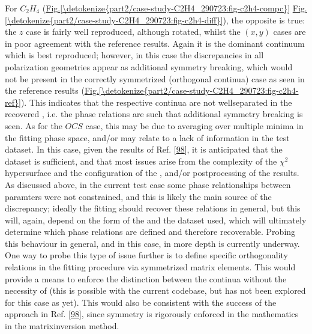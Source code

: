 \documentclass[letterpaper,table,10pt,english]{jupyterBook}
\begin{document}
\sphinxAtStartPar
For \(C_2H_4\) (\hyperref[\detokenize{part2/case-study-C2H4_290723:fig-c2h4-compc}]{Fig.\@ \ref{\detokenize{part2/case-study-C2H4_290723:fig-c2h4-compc}}} \sphinxhyphen{} \hyperref[\detokenize{part2/case-study-C2H4_290723:fig-c2h4-diff}]{Fig.\@ \ref{\detokenize{part2/case-study-C2H4_290723:fig-c2h4-diff}}}), the opposite is true: the \(z\) case is fairly well reproduced, although rotated, whilst the \((x,y)\) cases are in poor agreement with the reference results. Again it is the dominant continuum which is best reproduced; however, in this case the discrepancies in all polarization geometries appear as additional symmetry breaking, which would not be present in the correctly symmetrized (orthogonal continua) case \sphinxhyphen{} as seen in the reference results (\hyperref[\detokenize{part2/case-study-C2H4_290723:fig-c2h4-ref}]{Fig.\@ \ref{\detokenize{part2/case-study-C2H4_290723:fig-c2h4-ref}}}). This indicates that the respective continua are not well\sphinxhyphen{}separated in the recovered {\hyperref[\detokenize{backmatter/glossary:term-radial-matrix-elements}]{}}, i.e. the phase relations are such that additional symmetry breaking is seen. As for the \(OCS\) case, this may be due to averaging over multiple minima in the fitting phase space, and/or may relate to a lack of information in the test dataset. In this case, given the results of Ref. {[}\hyperlink{cite.backmatter/bibliography:id635}{98}{]}, it is anticipated that the dataset is sufficient, and that most issues arise from the complexity of the \(\chi^2\) hypersurface and the configuration of the {\hyperref[\detokenize{backmatter/glossary:term-bootstrap-retrieval-protocol}]{}}, and/or post\sphinxhyphen{}processing of the results. As discussed above, in the current test case some phase relationships between paramters were not constrained, and this is likely the main source of the discrepancy; ideally the fitting should recover these relations in general, but this will, again, depend on the form of the {\hyperref[\detokenize{backmatter/glossary:term-channel-functions}]{}} and the dataset used, which will ultimately determine which phase relations are defined and therefore recoverable. Probing this behaviour in general, and in this case, in more depth is currently underway. One way to probe this type of issue further is to define specific orthogonality relations in the fitting procedure via symmetrized matrix elements. This would provide a means to enforce the distinction between the continua without the necessity of  {\hyperref[\detokenize{backmatter/glossary:term-radial-matrix-elements}]{}} (this is possible with the current codebase, but has not been explored for this case as yet). This would also be consistent with the success of the approach in  Ref. {[}\hyperlink{cite.backmatter/bibliography:id635}{98}{]}, since symmetry is rigorously enforced in the mathematics in the matrix\sphinxhyphen{}inversion method.
\end{document}
